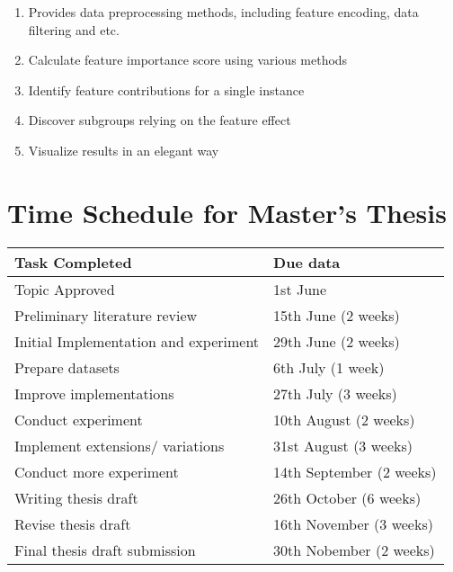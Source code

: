 \documentclass[runningheads]{llncs}
\begin{document}
	\begin{enumerate}
		\item Provides data preprocessing methods, including feature encoding, data filtering and etc.
		\item Calculate feature importance score using various methods
		\item Identify feature contributions for a single instance
		\item Discover subgroups relying on the feature effect
		\item Visualize results in an elegant way
	\end{enumerate}
	
	\section{Time Schedule for Master’s Thesis }
	
	\begin{table}
		\centering
		\begin{tabular}{| l | l | }
			\hline
			Task Completed & Due data\\
			\hline
			Topic Approved & 1st June \\
			Preliminary literature review & 15th June (2 weeks) \\
			Initial Implementation and experiment & 29th June (2 weeks) \\
			Prepare datasets & 6th July (1 week) \\
			Improve implementations & 27th July (3 weeks) \\
			Conduct experiment & 10th August (2 weeks) \\
			Implement extensions/ variations & 31st August (3 weeks) \\
			Conduct more experiment & 14th September (2 weeks) \\
			Writing thesis draft & 26th October (6 weeks) \\
			Revise thesis draft & 16th November (3 weeks) \\
			Final thesis draft submission & 30th Nobember (2 weeks) \\
			\hline
		\end{tabular}
		
	\end{table}
	
	

	
	
	
	
\end{document}
